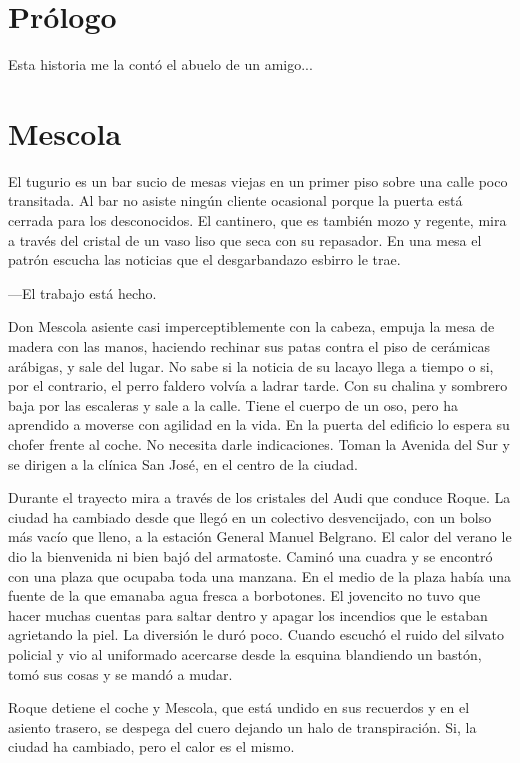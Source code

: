 \chapter*{Prólogo}

Esta historia me la contó el abuelo de un amigo...

\chapter*{Mescola}

El tugurio es un bar sucio de mesas viejas en un primer piso sobre una calle poco transitada. Al bar no asiste ningún cliente ocasional porque
la puerta está cerrada para los desconocidos. El cantinero, que es también mozo y regente, mira a través del cristal de un vaso
liso que seca con su repasador. En una mesa el patrón escucha las noticias que el desgarbandazo esbirro le trae.

---El trabajo está hecho.

Don Mescola asiente casi imperceptiblemente con la cabeza, empuja la mesa de madera con las manos, haciendo rechinar sus patas contra el piso de cerámicas arábigas, y sale del lugar. No sabe si la noticia de su lacayo llega a tiempo o si, por el contrario, el perro faldero volvía a ladrar tarde. Con su chalina y sombrero baja por las escaleras y sale a la calle. Tiene el cuerpo de un oso, pero ha aprendido a moverse con agilidad en la vida. En la puerta del edificio lo espera su chofer frente al coche. No necesita darle indicaciones. Toman la Avenida del Sur y se dirigen a la clínica San José, en el centro de la ciudad.

Durante el trayecto mira a través de los cristales del Audi que conduce Roque. La ciudad ha cambiado desde que llegó en un colectivo desvencijado, con un bolso más vacío que lleno, a la estación General Manuel Belgrano. El calor del verano le dio la bienvenida ni bien bajó del armatoste. Caminó una cuadra y se encontró con una plaza que ocupaba toda una manzana. En el medio de la plaza había una fuente de la que emanaba agua fresca a borbotones. El jovencito no tuvo que hacer muchas cuentas para saltar dentro y apagar los incendios que le estaban agrietando la piel. La diversión le duró poco. Cuando escuchó el ruido del silvato policial y vio al uniformado acercarse desde la esquina blandiendo un bastón, tomó sus cosas y se mandó a mudar. 

Roque detiene el coche y Mescola, que está undido en sus recuerdos y en el asiento trasero, se despega del cuero dejando un halo de transpiración. Si, la ciudad ha cambiado, pero el calor es el mismo.

